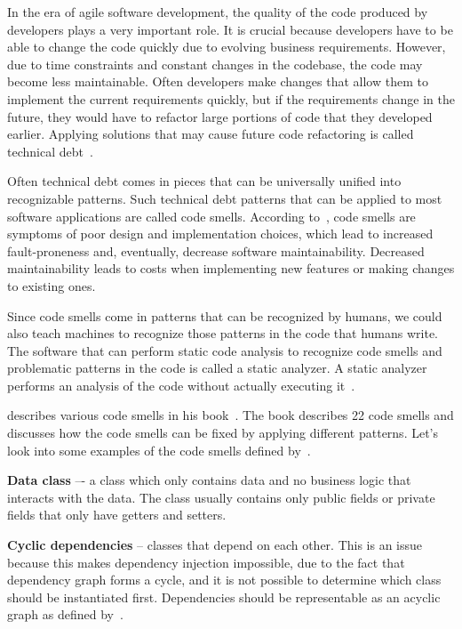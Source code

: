 
In the era of agile software development, the quality of the code produced by developers plays a very important role.
It is crucial because developers have to be able to change the code quickly due to evolving business requirements.
However, due to time constraints and constant changes in the codebase, the code may become less maintainable.
Often developers make changes that allow them to implement the current requirements quickly, but if the requirements
change in the future, they would have to refactor large portions of code that they developed earlier.
Applying solutions that may cause future code refactoring is called technical debt~\cite{technical-debt}.

Often technical debt comes in pieces that can be universally unified into recognizable patterns.
Such technical debt patterns that can be applied to most software applications are called code smells.
According to~\cite{code-smell-definition}, code smells are symptoms of poor design and implementation choices, which
lead to increased fault-proneness and, eventually, decrease software maintainability.
Decreased maintainability leads to costs when implementing new features or making changes to existing ones.

Since code smells come in patterns that can be recognized by humans, we could also teach machines to recognize those
patterns in the code that humans write.
The software that can perform static code analysis to recognize code smells and problematic patterns in the code
is called a static analyzer.
A static analyzer performs an analysis of the code without actually executing it~\cite{static-analyzers-paper}.

\citeauthor{refactoring-fowler} describes various code smells in his book~\cite{refactoring-fowler}.
The book describes 22 code smells and discusses how the code smells can be fixed by applying different
patterns.
Let's look into some examples of the code smells defined by~\citeauthor{refactoring-fowler}.

\begin{flushleft}
    \textbf{Data class} –- a class which only contains data and no business logic that interacts
    with the data.
    The class usually contains only public fields or private fields that only have getters and setters.
\end{flushleft}

\begin{flushleft}
    \textbf{Cyclic dependencies} -- classes that depend on each other.
    This is an issue because this makes dependency injection impossible, due to the fact that dependency graph forms
    a cycle, and it is not possible to determine which class should be instantiated first.
    Dependencies should be representable as an acyclic graph as defined by~\citeauthor{refactoring-fowler}.
\end{flushleft}

